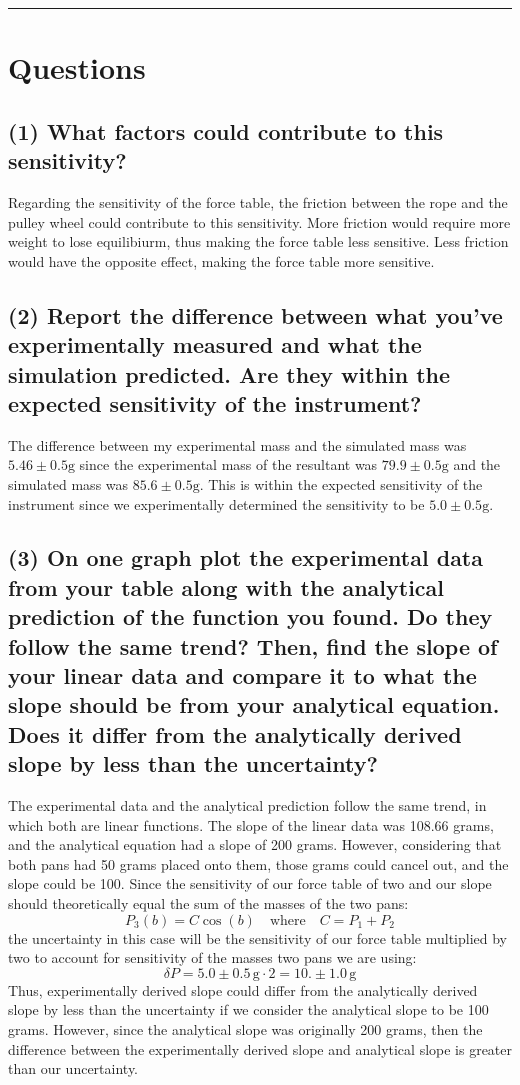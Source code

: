 \documentclass{article}
\begin{document}
\bigskip
\hrule

\section{Questions}
\subsection*{\normalsize(1) What factors could contribute to this sensitivity?}
Regarding the sensitivity of the force table, the friction between the rope 
and the pulley wheel could contribute to this sensitivity. More friction would 
require more weight to lose equilibiurm, thus making the force table less 
sensitive. Less friction would have the opposite effect, making the force table 
more sensitive.

\subsection*{\normalsize(2) Report the difference between what you've experimentally measured and 
what the simulation predicted. Are they within the expected sensitivity of the 
instrument?}
The difference between my experimental mass and the simulated mass was $5.46\pm0.5\mathrm{g}$
since the experimental mass of the resultant was $79.9\pm0.5\mathrm{g}$ and the simulated mass 
was $85.6\pm0.5\mathrm{g}$. This is within the expected sensitivity of the instrument since we 
experimentally determined the sensitivity to be $5.0\pm0.5\mathrm{g}$.

\subsection*{\normalsize(3) On one graph plot the experimental data from your table along with the 
analytical prediction of the function you found. Do they follow the same trend?
Then, find the slope of your linear data and compare it to what the slope should be from 
your analytical equation. Does it differ from the analytically derived slope by less 
than the uncertainty?}
The experimental data and the analytical prediction follow the same trend, in which both 
are linear functions. The slope of the linear data was 108.66 grams, and the analytical equation had a slope of 
200 grams. However, considering that both pans had 50 grams placed onto them, those grams 
could cancel out, and the slope could be 100. Since the sensitivity of our force table of two
and our slope should theoretically equal the sum of the masses of the two pans:
\[ P_3(b) = C\cos(b) \quad \text{where} \quad C=P_1+P_2 \]
the uncertainty in this case will be the sensitivity of our force table multiplied by two to
account for sensitivity of the masses two pans we are using:
\[ \delta P = 5.0\pm0.5\,\mathrm{g}\cdot 2 = 10.\pm1.0\,\mathrm{g} \]
Thus, experimentally derived slope could differ from the analytically derived slope by 
less than the uncertainty if we consider the analytical slope to be 100 grams. However, 
since the analytical slope was originally 200 grams, then the difference between the 
experimentally derived slope and analytical slope is greater than our uncertainty.
\end{document}
